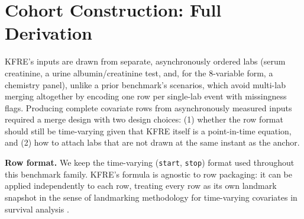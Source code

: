 \appendix

\section{Cohort Construction: Full Derivation} \label{app:cohort}

KFRE's inputs are drawn from separate, asynchronously ordered labs (serum creatinine, a urine albumin/creatinine test, and, for the 8-variable form, a chemistry panel), unlike a prior benchmark's scenarios, which avoid multi-lab merging altogether by encoding one row per single-lab event with missingness flags. Producing complete covariate rows from asynchronously measured inputs required a merge design with two design choices: (1) whether the row format should still be time-varying given that KFRE itself is a point-in-time equation, and (2) how to attach labs that are not drawn at the same instant as the anchor.

\textbf{Row format.} We keep the time-varying (\texttt{start}, \texttt{stop}) format used throughout this benchmark family. KFRE's formula is agnostic to row packaging: it can be applied independently to each row, treating every row as its own landmark snapshot in the sense of landmarking methodology for time-varying covariates in survival analysis \citep{vanhouwelingen2007landmarking,putter2022landmarking2}.

